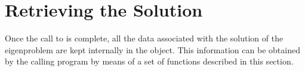

\section{Retrieving the Solution}
\label{sec:retrsol}

Once the call to  is complete, all the data associated with the solution of the eigenproblem are kept internally in the  object. This information can be obtained by the calling program by means of a set of functions described in this section.

